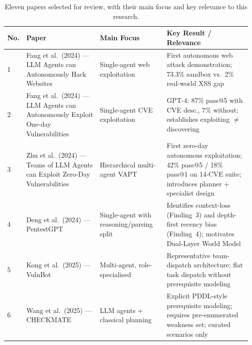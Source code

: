\begin{table}[htbp]
	\centering
	\small
	\caption{Eleven papers selected for review, with their main focus and key relevance to this research.}
	\label{tab:lit-table}
	\begin{tabular}{@{}p{0.4cm}p{4.5cm}p{3.8cm}p{4.5cm}@{}}
		\toprule
		\textbf{No.} & \textbf{Paper}                                                                                             & \textbf{Main Focus}                       & \textbf{Key Result / Relevance}                                                                                           \\
		\midrule
		1            & Fang et al.\ (2024) --- LLM Agents can Autonomously Hack Websites \citep{fang2024hackwebsites}             & Single-agent web exploitation             & First autonomous web attack demonstration; 73.3\% sandbox vs.\ 2\% real-world XSS gap                                     \\
		2            & Fang et al.\ (2024) --- LLM Agents can Autonomously Exploit One-day Vulnerabilities \citep{fang2024oneday} & Single-agent CVE exploitation             & GPT-4: 87\% pass@5 with CVE desc., 7\% without; establishes exploiting $\neq$ discovering                                 \\
		3            & Zhu et al.\ (2024) --- Teams of LLM Agents can Exploit Zero-Day Vulnerabilities \citep{zhu2024hptsa}       & Hierarchical multi-agent VAPT             & First zero-day autonomous exploitation; 42\% pass@5 / 18\% pass@1 on 14-CVE suite; introduces planner + specialist design \\
		4            & Deng et al.\ (2024) --- PentestGPT \citep{deng2024pentestgpt}                                              & Single-agent with reasoning/parsing split & Identifies context-loss (Finding~3) and depth-first recency bias (Finding~4); motivates Dual-Layer World Model            \\
		5            & Kong et al.\ (2025) --- VulnBot \citep{kong2025vulnbot}                                                    & Multi-agent, role-specialised             & Representative team-dispatch architecture; flat task dispatch without prerequisite modeling                               \\
		6            & Wang et al.\ (2025) --- CHECKMATE \citep{wang2025checkmate}                                                & LLM agents + classical planning           & Explicit PDDL-style prerequisite modeling; requires pre-enumerated weakness set; curated scenarios only                   \\

\end{tabular}
\end{table}

